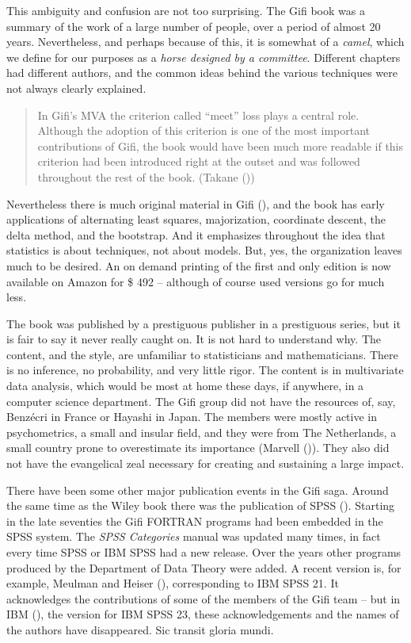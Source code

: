 \documentclass[
  12pt,
]{book}
\begin{document}
This ambiguity and confusion are not too surprising. The Gifi book was a summary of the work of a large number of people, over a period of almost 20 years. Nevertheless, and perhaps because of this, it is somewhat of a \emph{camel}, which we define for our purposes as a \emph{horse designed by a committee}. Different chapters had different authors, and the common ideas behind the various techniques were not always clearly explained.

\begin{quote}
In Gifi's MVA the criterion called ``meet'' loss plays a central role. Although the
adoption of this criterion is one of the most important contributions of Gifi, the
book would have been much more readable if this criterion had been introduced right
at the outset and was followed throughout the rest of the book. (Takane ())
\end{quote}

Nevertheless there is much original material in Gifi (), and the book has early applications of alternating least squares, majorization, coordinate descent, the delta method, and the bootstrap. And it emphasizes throughout the idea that statistics is about techniques, not about models. But, yes, the organization leaves much to be desired. An on demand printing of the first and only edition is now available on Amazon for \$ 492 -- although of course used versions go for much less.

The book was published by a prestiguous publisher in a prestiguous series, but it is fair to say it never really caught on. It is not hard to understand why. The content, and the style, are unfamiliar to statisticians and mathematicians. There is no inference, no probability, and very little rigor. The content is in multivariate data analysis, which would be most at home these days, if anywhere, in a computer science department. The Gifi group did not have the resources of, say, Benzécri in France or Hayashi in Japan. The members were mostly active in psychometrics, a small and insular field, and they were from The Netherlands, a small country prone to overestimate its importance (Marvell ()). They also did not have the evangelical zeal necessary for creating and sustaining a large impact.

There have been some other major publication events in the Gifi saga. Around the same time as the Wiley book there was the publication of SPSS (). Starting in the late seventies the Gifi FORTRAN programs had been embedded in the SPSS system. The \emph{SPSS Categories} manual was updated many times, in fact every time SPSS or IBM SPSS had a new release. Over the years other programs produced by the Department of Data Theory were added. A recent version is, for example, Meulman and Heiser (), corresponding to IBM SPSS 21. It acknowledges the contributions of some of the members of the Gifi team -- but in IBM (), the version for IBM SPSS 23, these acknowledgements and the names of the authors have disappeared. Sic transit gloria mundi.
\end{document}
